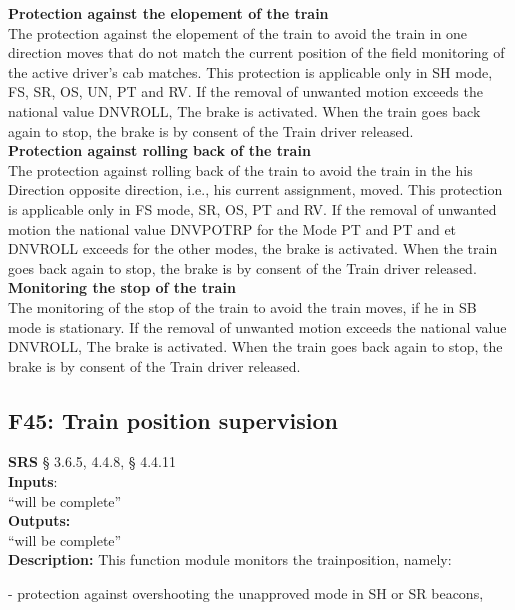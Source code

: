 \documentclass{template/openetcs_report}
\begin{document}
\textbf{Protection against the elopement of the train}\\
The protection against the elopement of the train to avoid the train in one direction 
moves that do not match the current position of the field monitoring of the active driver's cab 
matches. 
This protection is applicable only in SH mode, FS, SR, OS, UN, PT and RV.
If the removal of unwanted motion exceeds the national value DNVROLL, 
The brake is activated. 
When the train goes back again to stop, the brake is by consent of the 
Train driver released. \\

\textbf{Protection against rolling back of the train }\\
The protection against rolling back of the train to avoid the train in the his 
Direction opposite direction, i.e., his current assignment, moved. 
This protection is applicable only in FS mode, SR, OS, PT and RV. 
If the removal of unwanted motion the national value DNVPOTRP for the 
Mode PT and PT and et DNVROLL exceeds for the other modes, the brake is 
activated. When the train goes back again to stop, the brake is by consent of the Train driver released. \\

\textbf{Monitoring the stop of the train }\\
The monitoring of the stop of the train to avoid the train moves, if he in 
SB mode is stationary. 
If the removal of unwanted motion exceeds the national value DNVROLL, 
The brake is activated. 
When the train goes back again to stop, the brake is by consent of the 
Train driver released.\\


\subsection {F45: Train position supervision}
\textbf{SRS} § 3.6.5, 4.4.8, § 4.4.11\\

\textbf{Inputs}:\\
``will be complete''\\
 
 \textbf{Outputs:}\\
 ``will be complete''\\
 
 \textbf{Description:} 
 This function module monitors the trainposition, namely: 

- protection against overshooting the unapproved mode in SH or SR beacons, \\
\end{document}
